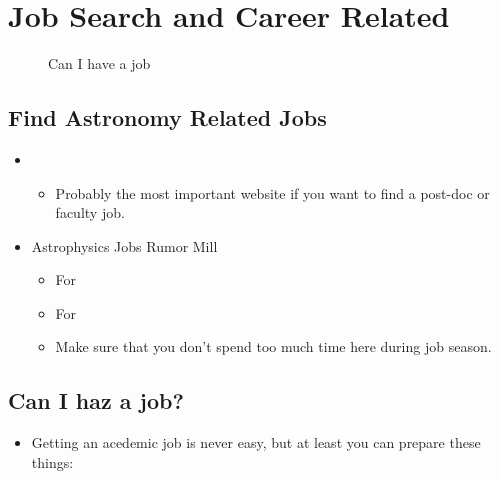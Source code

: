 \documentclass[letterpaper,10pt,english]{sphinxmanual}
\begin{document}
\section{Job Search and Career Related}
\label{\detokenize{resource/research/job_and_career:job-search-and-career-related}}\label{\detokenize{resource/research/job_and_career::doc}}
\begin{figure}[htbp]
\centering
\capstart

\noindent{}
\caption{Can I have a job}\label{\detokenize{resource/research/job_and_career:id1}}\end{figure}


\subsection{Find Astronomy Related Jobs}
\label{\detokenize{resource/research/job_and_career:find-astronomy-related-jobs}}\begin{itemize}
\item {} 
\begin{itemize}
\item {} 
Probably the most important website if you want to find a post-doc
or faculty job.

\end{itemize}

\item {} 
Astrophysics Jobs Rumor Mill
\begin{itemize}
\item {} 
For 

\item {} 
For 

\item {} 
Make sure that you don’t spend too much time here during job
season.

\end{itemize}

\end{itemize}


\subsection{Can I haz a job?}
\label{\detokenize{resource/research/job_and_career:can-i-haz-a-job}}\begin{itemize}
\item {} 
Getting an acedemic job is never easy, but at least you can prepare
these things:

\end{itemize}
\end{document}
